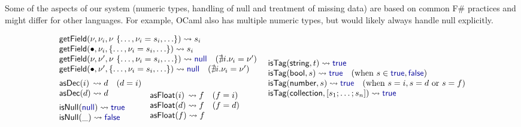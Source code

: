 \documentclass[10pt,preprint,clearpagebib]{sigplanconf}
\newcommand{\kvd}[1]{\textnormal{\textcolor{kvdclr}{\sffamily #1}}}
\newcommand{\ident}[1]{\textnormal{\sffamily #1}}
\newcommand{\reduce}{\rightsquigarrow}
\begin{document}
Some of the aspects of our system (numeric types, handling of \kvd{null} and treatment of
missing data) are based on common F\# practices and might differ for other languages. For example, 
OCaml also has multiple numeric types, but would likely always handle \kvd{null} explicitly.


\begin{figure}
\begin{equation*}
\begin{array}{l}
\ident{getField}(\nu,\nu_i, \nu~\{\ldots, \nu_i=s_i, \ldots\}) \reduce s_i\\
\ident{getField}(\bullet, \nu_i, \{\ldots, \nu_i=s_i, \ldots\}) \reduce s_i\\
\ident{getField}(\nu,\nu', \nu~\{\ldots, \nu_i=s_i, \ldots\}) \reduce \kvd{null}\quad(\nexists i.\nu_i=\nu' )\\
\ident{getField}(\bullet, \nu', \{\ldots, \nu_i=s_i, \ldots\}) \reduce \kvd{null}\quad(\nexists i.\nu_i=\nu' )
\\[0.5em]
\hspace{-0.5em}
\begin{array}{l}
\ident{asDec}(i) \,\reduce d\quad(d = i)\\
\ident{asDec}(d) \reduce d
\\[0.5em]
\ident{isNull}(\kvd{null}) \reduce \kvd{true} \\
\ident{isNull}(\_) \reduce \kvd{false} 
\end{array}
\begin{array}{l}
\\
\ident{asFloat}(i) \,\reduce f\quad(f = i)\\
\ident{asFloat}(d) \reduce f\quad(f = d)\\
\ident{asFloat}(f) \reduce f\\
\end{array}
\end{array}
~
\begin{array}{l}
\ident{isTag}(\ident{string}, t) \reduce \kvd{true} \\
\ident{isTag}(\ident{bool}, s) \reduce \kvd{true} \quad(\textnormal{when}~s\in{\kvd{true},\kvd{false}} )\\
\ident{isTag}(\ident{number}, s) \reduce \kvd{true} \quad(\textnormal{when}~s=i, s=d ~\textnormal{or}~ s=f) \\
\ident{isTag}(\ident{collection}, [s_1; \ldots; s_n]) \reduce \kvd{true} \\

\end{array}
\end{equation*}
\end{figure}
\end{document}
